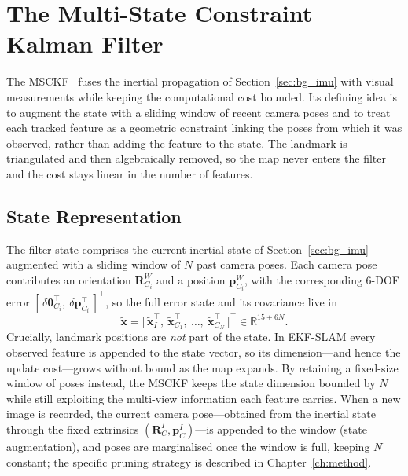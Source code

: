 \section{The Multi-State Constraint Kalman Filter}
\label{sec:bg_msckf}

The MSCKF~\cite{Mourikis_2007} fuses the inertial propagation of Section~\ref{sec:bg_imu} with visual measurements while keeping the computational cost bounded. Its defining idea is to augment the state with a sliding window of recent camera poses and to treat each tracked feature as a geometric constraint linking the poses from which it was observed, rather than adding the feature to the state. The landmark is triangulated and then algebraically removed, so the map never enters the filter and the cost stays linear in the number of features.

\subsection{State Representation}
\label{sec:bg_state}
The filter state comprises the current inertial state of Section~\ref{sec:bg_imu} augmented with a sliding window of $N$ past camera poses. Each camera pose contributes an orientation $\mathbf{R}_{C_i}^{W}$ and a position $\mathbf{p}_{C_i}^{W}$, with the corresponding $6$-DOF error $[\,\delta\boldsymbol{\theta}_{C_i}^{\top},\ \delta\mathbf{p}_{C_i}^{\top}\,]^{\top}$, so the full error state and its covariance live in
\begin{equation}
  \tilde{\mathbf{x}} = \big[\, \tilde{\mathbf{x}}_I^{\top},\ \tilde{\mathbf{x}}_{C_1}^{\top},\ \dots,\ \tilde{\mathbf{x}}_{C_N}^{\top} \,\big]^{\top} \in \mathbb{R}^{15+6N}.
\end{equation}
Crucially, landmark positions are \emph{not} part of the state. In EKF-SLAM every observed feature is appended to the state vector, so its dimension---and hence the update cost---grows without bound as the map expands. By retaining a fixed-size window of poses instead, the MSCKF keeps the state dimension bounded by $N$ while still exploiting the multi-view information each feature carries. When a new image is recorded, the current camera pose---obtained from the inertial state through the fixed extrinsics $(\mathbf{R}_{C}^{I}, \mathbf{p}_{C}^{I})$---is appended to the window (state augmentation), and poses are marginalised once the window is full, keeping $N$ constant; the specific pruning strategy is described in Chapter~\ref{ch:method}.

